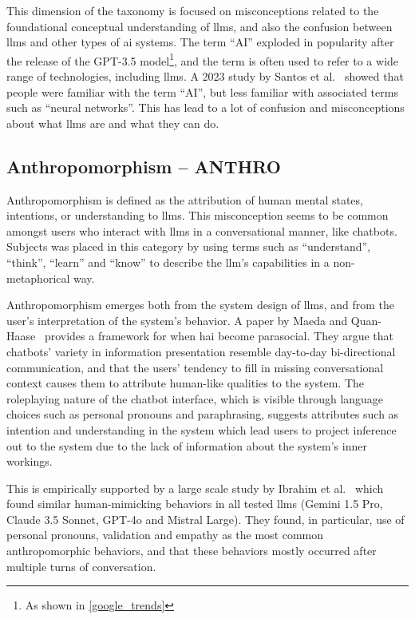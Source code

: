 This dimension of the taxonomy is focused on misconceptions related to the foundational conceptual understanding of \gls{llms}, and also the confusion between \gls{llms} and other types of \gls{ai} systems. The term ``AI'' exploded in popularity after the release of the GPT-3.5 model\footnote{As shown in \autoref{google_trends}}, and the term is often used to refer to a wide range of technologies, including \gls{llms}. A 2023 study by Santos et al.~\cite{santos_survey_2023} showed that people were familiar with the term ``AI'', but less familiar with associated terms such as ``neural networks''. This has lead to a lot of confusion and misconceptions about what \gls{llms} are and what they can do.

\subsection{Anthropomorphism -- ANTHRO}\label{anthro}
Anthropomorphism is defined as the attribution of human mental states, intentions, or understanding to \gls{llms}. This misconception seems to be common amongst users who interact with \gls{llms} in a conversational manner, like chatbots. Subjects was placed in this category by using terms such as ``understand'', ``think'', ``learn'' and ``know'' to describe the \gls{llm}'s capabilities in a non-metaphorical way.

Anthropomorphism emerges both from the system design of \gls{llms}, and from the user's interpretation of the system's behavior. A paper by Maeda and Quan-Haase~\cite{maeda_when_2024} provides a framework for when \gls{hai} become parasocial. 
They argue that chatbots' variety in information presentation resemble day-to-day bi-directional communication, and that the users' tendency to fill in missing conversational context causes them to attribute human-like qualities to the system. 
The roleplaying nature of the chatbot interface, which is visible through language choices such as personal pronouns and paraphrasing, suggests attributes such as intention and understanding in the system which lead users to project inference out to the system due to the lack of information about the system's inner workings.

This is empirically supported by a large scale study by Ibrahim et al.~\cite{ibrahim_multi-turn_2026} which found similar human-mimicking behaviors in all tested \gls{llms} (Gemini 1.5 Pro, Claude 3.5 Sonnet, GPT-4o and Mistral Large). They found, in particular, use of personal pronouns, validation and empathy as the most common anthropomorphic behaviors, and that these behaviors mostly occurred after multiple turns of conversation.

